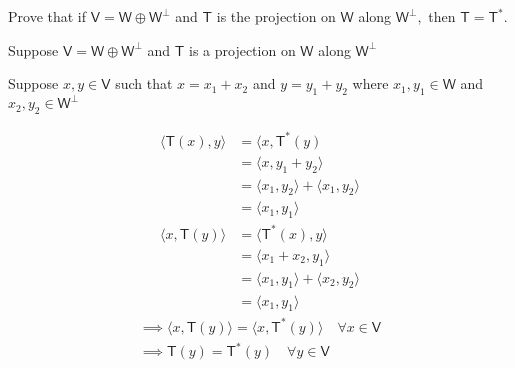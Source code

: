Prove that if $\mathsf{V}=\mathsf{W}\oplus \mathsf{W}^\perp$ and
$\mathsf{T}$ is the projection on $\mathsf{W}$ along
$\mathsf{W}^\perp,$ then $\mathsf{T}=\mathsf{T}^*.$

Suppose $\mathsf{V} = \mathsf{W}\oplus \mathsf{W}^\perp$ and
$\mathsf{T}$ is a projection on $\mathsf{W}$ along $\mathsf{W}^\perp$

Suppose $x,y \in \mathsf{V}$ such that $x=x_1+x_2$ and $y=y_1+y_2$
where $x_1,y_1 \in \mathsf{W}$ and $x_2,y_2 \in \mathsf{W}^\perp$

\begin{align}
\langle \mathsf{T}(x), y \rangle &= \langle x,\mathsf{T}^*(y)\\
&=\langle x,y_1+y_2\rangle\\
&=\langle x_1,y_2 \rangle + \langle x_1,y_2\rangle\\
&= \langle x_1,y_1 \rangle
\end{align}
\begin{align}
\langle x, \mathsf{T}(y) \rangle &= \langle \mathsf{T}^*(x), y
\rangle\\
&= \langle x_1+x_2,y_1 \rangle\\
&= \langle x_1,y_1 \rangle + \langle x_2,y_2 \rangle \\
&=\langle x_1,y_1 \rangle
\end{align}
\begin{gather}
\implies \langle x, \mathsf{T}(y) \rangle = \langle x, \mathsf{T}^*(y)
\rangle \quad \forall x \in \mathsf{V}\\
\implies \mathsf{T}(y) = \mathsf{T}^*(y) \quad \forall y \in \mathsf{V}
\end{gather}
